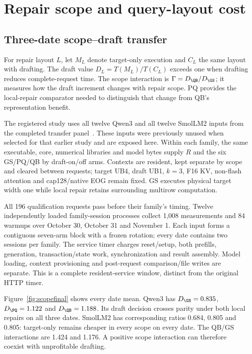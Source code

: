 \section{Repair scope and query-layout cost}
\label{sec:results}
\subsection{Three-date scope--draft transfer}
\label{sec:scopefinal}
For repair layout $L$, let $M_L$ denote target-only execution and $C_L$ the same layout with drafting. The draft value $D_L=T(M_L)/T(C_L)$ exceeds one when drafting reduces complete-request time. The scope interaction is $\Gamma=D_{\QB}/D_{\GS}$; it measures how the draft increment changes with repair scope. PQ provides the local-repair comparator needed to distinguish that change from QB's representation benefit.

The registered study uses all twelve Qwen3 and all twelve SmolLM2 inputs from the completed transfer panel~\cite{rtxscopetransfer}. These inputs were previously unused when selected for that earlier study and are exposed here. Within each family, the same executable, core, numerical libraries and model bytes supply $R$ and the six GS/PQ/QB by draft-on/off arms. Contexts are resident, kept separate by scope and cleared between requests; target UB4, draft UB1, $k=3$, F16 KV, non-flash attention and cap128/native EOG remain fixed. GS executes physical target width one while local repair retains surrounding multirow computation.

All 196 qualification requests pass before their family's timing. Twelve independently loaded family-session processes collect 1,008 measurements and 84 warmups over October 30, October 31 and November 1. Each input forms a contiguous seven-arm block with a frozen rotation; every date contains two sessions per family. The service timer charges reset/setup, both prefills, generation, transaction/state work, synchronization and result assembly. Model loading, context provisioning and post-request comparison/file writes are separate. This is a complete resident-service window, distinct from the original HTTP timer.

Figure~\ref{fig:scopefinal} shows every date mean. Qwen3 has $D_{\GS}=0.835$, $D_{\PQ}=1.122$ and $D_{\QB}=1.188$. Its draft decision crosses parity under both local repairs on all three dates. SmolLM2 has corresponding ratios 0.684, 0.805 and 0.805: target-only remains cheaper in every scope on every date. The QB/GS interactions are 1.424 and 1.176. A positive scope interaction can therefore coexist with unprofitable drafting.

